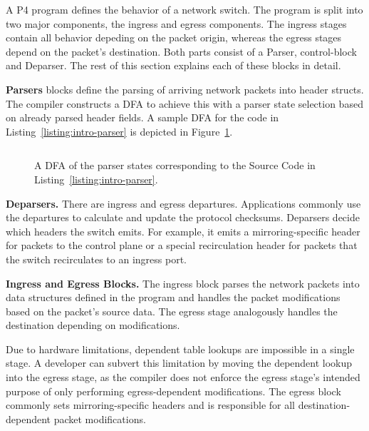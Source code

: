 A P4 program defines the behavior of a network switch. The program is split into two major components, the ingress and egress components. The ingress stages contain all behavior depeding on the packet origin, whereas the egress stages depend on the packet's destination. Both parts consist of a Parser, control-block and Deparser. The rest of this section explains each of these blocks in detail.

\textbf{Parsers} blocks define the parsing of arriving network packets into header structs. The compiler constructs a \ac{DFA}  to achieve this with a parser state selection based on already parsed header fields. A sample \ac{DFA} for the code in Listing~\ref{listing:intro-parser} is depicted in Figure~\ref{fig:intro-parser}.

\begin{listing}[H]
  \begin{multicols}{2}
    \inputminted{cpp}{code/intro-parser.p4}
  \end{multicols}
  \caption{\label{listing:intro-parser} P4 Source Code of a Parser corresponding to the graph depicted in Figure~\ref{fig:intro-parser}. The defined automaton of parser states fills the  according to the parser rules.}
\end{listing}

\begin{figure}[H]
  \centering
  
  \caption{\label{fig:intro-parser} A \ac{DFA} of the parser states corresponding to the Source Code in Listing~\ref{listing:intro-parser}.}
\end{figure}

\textbf{Deparsers.}
There are ingress and egress departures. Applications commonly use the departures to calculate and update the protocol checksums. Deparsers decide which headers the switch emits. For example, it emits a mirroring-specific header for packets to the control plane or a special recirculation header for packets that the switch recirculates to an ingress port.

\textbf{Ingress and Egress Blocks.}
The ingress block parses the network packets into data structures defined in the program and handles the packet modifications based on the packet's source data. The egress stage analogously handles the destination depending on modifications.

Due to hardware limitations, dependent table lookups are impossible in a single stage. A developer can subvert this limitation by moving the dependent lookup into the egress stage, as the compiler does not enforce the egress stage's intended purpose of only performing egress-dependent modifications. The egress block commonly sets mirroring-specific headers and is responsible for all destination-dependent packet modifications.


